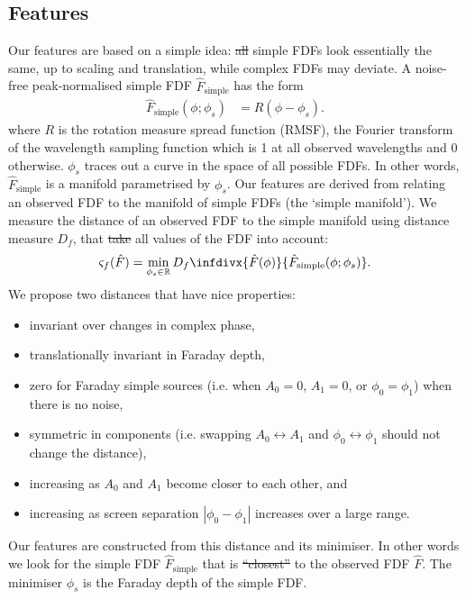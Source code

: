 \documentclass[11pt, a4paper]{book}
\providecommand{\DIFaddtex}[1]{{\protect\color{blue}\uwave{#1}}} %
\providecommand{\DIFdeltex}[1]{{\protect\color{red}\sout{#1}}}                      %
\providecommand{\DIFaddbegin}{} %
\providecommand{\DIFaddend}{} %
\providecommand{\DIFdelbegin}{} %
\providecommand{\DIFdelend}{} %
\providecommand{\DIFadd}[1]{\texorpdfstring{\DIFaddtex{#1}}{#1}} %
\providecommand{\DIFdel}[1]{\texorpdfstring{\DIFdeltex{#1}}{}} %
\newcommand{\DIFscaledelfig}{0.5}
\newlength{\DIFdelgraphicswidth} %
\newlength{\DIFdelgraphicsheight} %
\newcommand{\DIFaddincludegraphics}[2][]{{\color{blue}\fbox{\DIFOincludegraphics[#1]{#2}}}} %
\newcommand{\DIFdelincludegraphics}[2][]{%
\sbox{\DIFdelgraphicsbox}{\DIFOincludegraphics[#1]{#2}}%
\settoboxwidth{\DIFdelgraphicswidth}{\DIFdelgraphicsbox} %
\settoboxtotalheight{\DIFdelgraphicsheight}{\DIFdelgraphicsbox} %
\scalebox{\DIFscaledelfig}{%
\parbox[b]{\DIFdelgraphicswidth}{\usebox{\DIFdelgraphicsbox}\\[-\baselineskip] \rule{\DIFdelgraphicswidth}{0em}}\llap{\resizebox{\DIFdelgraphicswidth}{\DIFdelgraphicsheight}{%
\setlength{\unitlength}{\DIFdelgraphicswidth}%
\begin{picture}(1,1)%
\thicklines\linethickness{2pt} %
{\color[rgb]{1,0,0}\put(0,0){\framebox(1,1){}}}%
{\color[rgb]{1,0,0}\put(0,0){\line( 1,1){1}}}%
{\color[rgb]{1,0,0}\put(0,1){\line(1,-1){1}}}%
\end{picture}%
}\hspace*{3pt}}} %
} %
\DeclareRobustCommand{\DIFaddbegin}{\DIFOaddbegin \let\includegraphics\DIFaddincludegraphics} %
\DeclareRobustCommand{\DIFaddend}{\DIFOaddend \let\includegraphics\DIFOincludegraphics} %
\DeclareRobustCommand{\DIFdelbegin}{\DIFOdelbegin \let\includegraphics\DIFdelincludegraphics} %
\DeclareRobustCommand{\DIFdelend}{\DIFOaddend \let\includegraphics\DIFOincludegraphics} %
\begin{document}
  \subsection{Features}
  \label{sec:faraday-scores-method}

    Our features are based on a simple idea: \DIFdelbegin \DIFdel{all }\DIFdelend \DIFaddbegin \DIFadd{All }\DIFaddend simple FDFs look essentially the same, up to scaling and translation, while complex FDFs may deviate. A noise-free peak-normalised simple FDF $\hat F_{\mathrm{simple}}$ has the form\DIFaddbegin \DIFadd{:
    }\DIFaddend \begin{align}
        \label{eq:faraday-f-simple}
        \hat F_{\mathrm{simple}}(\phi; \phi_s) &= R(\phi - \phi_s).
    \end{align}
    where $R$ is the rotation measure spread function (RMSF), the Fourier transform of the wavelength sampling function which is 1 at all observed wavelengths and 0 otherwise. $\phi_s$ traces out a curve in the space of all possible FDFs. In other words, $\hat F_{\mathrm{simple}}$ is a manifold parametrised by $\phi_s$. Our features are derived from relating an observed FDF to the manifold of simple FDFs (the `simple manifold'). We measure the distance of an observed FDF to the simple manifold using distance measure $D_f$, that \DIFdelbegin \DIFdel{take }\DIFdelend \DIFaddbegin \DIFadd{takes }\DIFaddend all values of the FDF into account:
    \begin{equation}
        \label{eq:faraday-complexity-model}
        \varsigma_f(\hat F) = \min_{\phi_s \in \mathbb{R}} D_f\infdivx{\hat F(\phi)}{\hat F_{\mathrm{simple}}(\phi; \phi_s)}.
    \end{equation}
    We propose two distances that have nice properties:
    \begin{itemize}
        \item invariant over changes in complex phase,
        \item translationally invariant in Faraday depth,
        \item zero for Faraday simple sources (i.e. when $A_0 = 0$, $A_1 = 0$, or $\phi_0 = \phi_1$) when there is no noise,
        \item symmetric in components (i.e. swapping $A_0 \leftrightarrow A_1$ and $\phi_0 \leftrightarrow \phi_1$ should not change the distance),
        \item increasing as $A_0$ and $A_1$ become closer to each other, and
        \item increasing as screen separation $|\phi_0 - \phi_1|$ increases over a large range.
    \end{itemize}
    Our features are constructed from this distance and its minimiser. In other words
    we look for the simple FDF $\hat{F}_{\mathrm{simple}}$ that is \DIFdelbegin \DIFdel{``closest'' }\DIFdelend \DIFaddbegin \DIFadd{`closest' }\DIFaddend to the observed FDF $\hat{F}$.
    The minimiser $\phi_s$ is the Faraday depth of the simple FDF.
\end{document}
